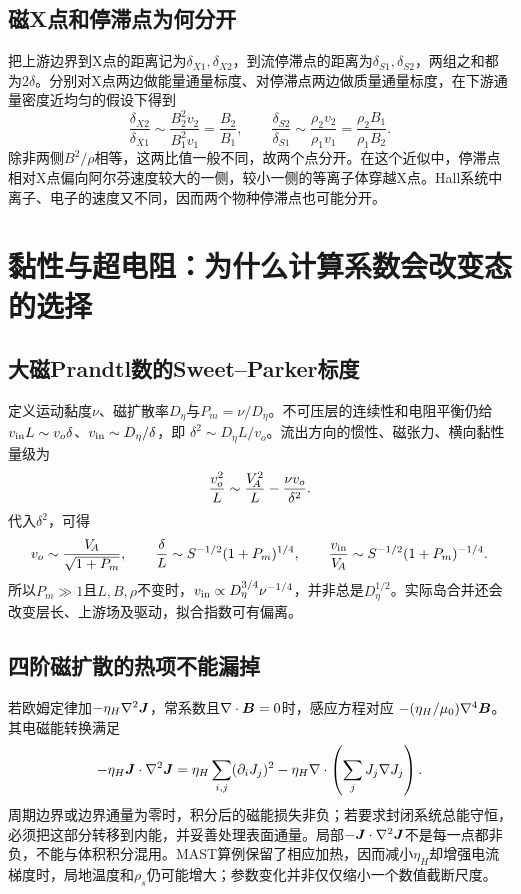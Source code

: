 \subsection{磁X点和停滞点为何分开}
把上游边界到X点的距离记为$\delta_{X1},\delta_{X2}$，到流停滞点的距离为$\delta_{S1},\delta_{S2}$，两组之和都为$2\delta$。分别对X点两边做能量通量标度、对停滞点两边做质量通量标度，在下游通量密度近均匀的假设下得到
\begin{equation}
 \frac{\delta_{X2}}{\delta_{X1}}
 \sim\frac{B_2^2v_2}{B_1^2v_1}=\frac{B_2}{B_1},\qquad
 \frac{\delta_{S2}}{\delta_{S1}}
 \sim\frac{\rho_2v_2}{\rho_1v_1}=\frac{\rho_2B_1}{\rho_1B_2}.
\end{equation}
除非两侧$B^2/\rho$相等，这两比值一般不同，故两个点分开。在这个近似中，停滞点相对X点偏向阿尔芬速度较大的一侧，较小一侧的等离子体穿越X点。Hall系统中离子、电子的速度又不同，因而两个物种停滞点也可能分开。

\section{黏性与超电阻：为什么计算系数会改变态的选择}
\subsection{大磁Prandtl数的Sweet--Parker标度}
定义运动黏度$\nu$、磁扩散率$D_\eta$与$P_m=\nu/D_\eta$。不可压层的连续性和电阻平衡仍给
$v_{\rm in}L\sim v_o\delta$、$v_{\rm in}\sim D_\eta/\delta$，即
$\delta^2\sim D_\eta L/v_o$。流出方向的惯性、磁张力、横向黏性量级为
\begin{equation}
 \frac{v_o^2}{L}\sim\frac{V_{\!A}^2}{L}-\frac{\nu v_o}{\delta^2}.
\end{equation}
代入$\delta^2$，可得
\begin{equation}
 v_o\sim\frac{V_{\!A}}{\sqrt{1+P_m}},\qquad
 \frac{\delta}{L}\sim S^{-1/2}(1+P_m)^{1/4},\qquad
 \frac{v_{\rm in}}{V_{\!A}}\sim S^{-1/2}(1+P_m)^{-1/4}.
\end{equation}
所以$P_m\gg1$且$L,B,\rho$不变时，$v_{\rm in}\propto D_\eta^{3/4}\nu^{-1/4}$，并非总是$D_\eta^{1/2}$。实际岛合并还会改变层长、上游场及驱动，拟合指数可有偏离。\citep{Stanier2013}

\subsection{四阶磁扩散的热项不能漏掉}
若欧姆定律加$-\eta_H\nabla^2\bm{J}$，常系数且$\nabla\cdot\bm{B}=0$时，感应方程对应
$-(\eta_H/\mu_0)\nabla^4\bm{B}$。其电磁能转换满足
\begin{equation}
 -\eta_H\bm{J}\cdot\nabla^2\bm{J}
 =\eta_H\sum_{i,j}(\partial_iJ_j)^2
 -\eta_H\nabla\cdot\left(\sum_jJ_j\nabla J_j\right).
\end{equation}
周期边界或边界通量为零时，积分后的磁能损失非负；若要求封闭系统总能守恒，必须把这部分转移到内能，并妥善处理表面通量。局部$-\bm{J}\cdot\nabla^2\bm{J}$不是每一点都非负，不能与体积积分混用。MAST算例保留了相应加热，因而减小$\eta_H$却增强电流梯度时，局地温度和$\rho_s$仍可能增大；参数变化并非仅仅缩小一个数值截断尺度。\citep{Stanier2013}

